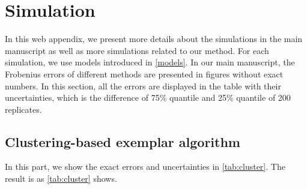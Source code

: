 \documentclass[useAMS,referee,usenatbib]{biom}
\begin{document}
\pagebreak
\appendix
\section*{Simulation} 
In this web appendix, we present more details about the simulations in the main manuscript as well as more simulations related to our method. For each simulation, we use models introduced in \ref{models}. In our main manuscript, the Frobenius errors of different methods are presented in figures without exact numbers. In this section, all the errors are displayed in the table with their uncertainties, which is the difference of 75\% quantile and 25\% quantile of 200 replicates.

\subsection{Clustering-based exemplar algorithm}
In this part, we show the exact errors and uncertainties in \ref{tab:cluster}. The result is as \ref{tab:cluster} shows.
\end{document}
